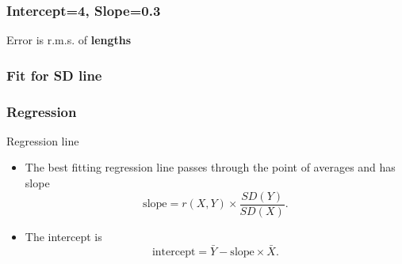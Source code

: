 \documentclass[handout]{beamer}
\begin{document}


   \begin{frame}
   \frametitle{Intercept=4, Slope=0.3}
   \begin{center}
   \end{center}
   Error is r.m.s. of {\bf \color{red} lengths}
   \end{frame}



   \begin{frame}
   \frametitle{Fit for SD line}
   \begin{center}
   \end{center}

   \end{frame}


   \begin{frame} \frametitle{Regression}

   \begin{block}
   {Regression line}
   \begin{itemize}
   \item    The best fitting regression line
   passes through
   the point of averages and has slope
   $$
   \text{slope} = r(X,Y) \times \frac{SD(Y)}{SD(X)}.
   $$
   \item The intercept is
   $$
   \text{intercept} = \bar{Y} - \text{slope} \times \bar{X}.
   $$
   \end{itemize}

   \end{block}
   \end{frame}
\end{document}
